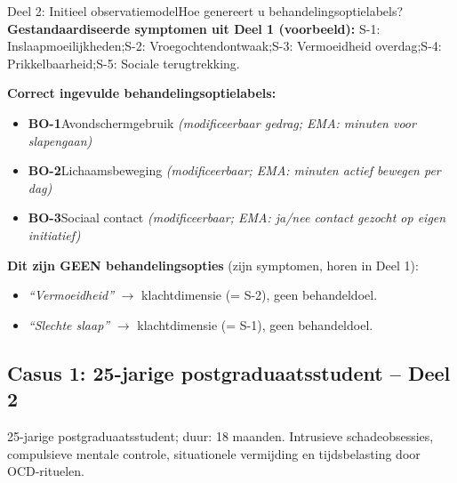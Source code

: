 \documentclass[11pt,a4paper]{article}
\begin{document}
\vspace{0.5em}
\nopagebreak[4]

\begin{voorbeeldbox}{Deel 2: Initieel observatiemodel}{Hoe genereert u behandelingsoptielabels?}
\small
\textbf{Gestandaardiseerde symptomen uit Deel 1 (voorbeeld):}
S-1: Inslaapmoeilijkheden;\enspace S-2: Vroegochtendontwaak;\enspace S-3: Vermoeidheid overdag;\enspace S-4: Prikkelbaarheid;\enspace S-5: Sociale terugtrekking.

\medskip
\textbf{Correct ingevulde behandelingsoptielabels:}
\begin{itemize}[topsep=2pt,itemsep=1pt]
\item \textbf{BO-1}\enspace Avondschermgebruik
  \hfill\textit{(modificeerbaar gedrag; EMA: minuten voor slapengaan)}
\item \textbf{BO-2}\enspace Lichaamsbeweging
  \hfill\textit{(modificeerbaar; EMA: minuten actief bewegen per dag)}
\item \textbf{BO-3}\enspace Sociaal contact
  \hfill\textit{(modificeerbaar; EMA: ja/nee contact gezocht op eigen initiatief)}
\end{itemize}

\medskip
\textbf{\color{StrongRed}Dit zijn GEEN behandelingsopties} (zijn symptomen, horen in Deel 1):
\begin{itemize}[topsep=1pt,itemsep=0pt]
\item \textit{``Vermoeidheid''} $\rightarrow$ klachtdimensie (= S-2), geen behandeldoel.
\item \textit{``Slechte slaap''} $\rightarrow$ klachtdimensie (= S-1), geen behandeldoel.
\end{itemize}
\end{voorbeeldbox}

\vspace{0.5em}

\newpage
\subsection*{Casus 1: 25-jarige postgraduaatsstudent -- Deel 2}

\begin{complaintbox}[title={Casus 1: verkorte klachtomschrijving}]
\small 25-jarige postgraduaatsstudent; duur: 18 maanden. Intrusieve schadeobsessies, compulsieve mentale controle, situationele vermijding en tijdsbelasting door OCD-rituelen.
\end{complaintbox}
\end{document}
